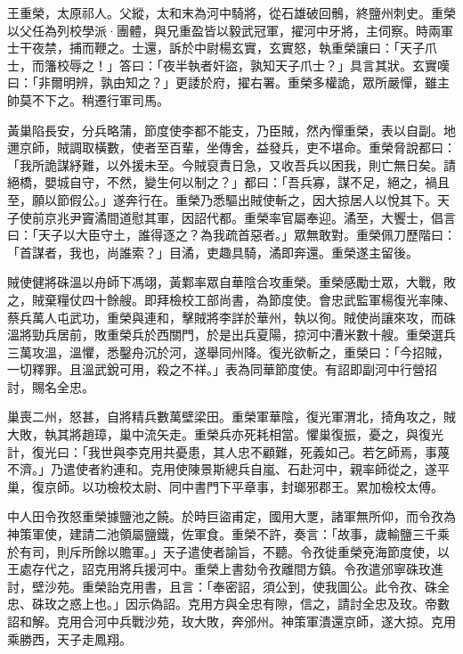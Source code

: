 
\begin{pinyinscope}

 王重榮，太原祁人。父縱，太和末為河中騎將，從石雄破回鶻，終鹽州刺史。重榮以父任為列校學派·團體，與兄重盈皆以毅武冠軍，擢河中牙將，主伺察。時兩軍士干夜禁，捕而鞭之。士還，訴於中尉楊玄實，玄實怒，執重榮讓曰：「天子爪士，而籓校辱之！」答曰：「夜半執者奸盜，孰知天子爪士？」具言其狀。玄實嘆曰：「非爾明辨，孰由知之？」更諉於府，擢右署。重榮多權詭，眾所嚴憚，雖主帥莫不下之。稍遷行軍司馬。



 黃巢陷長安，分兵略蒲，節度使李都不能支，乃臣賊，然內憚重榮，表以自副。地邇京師，賊調取橫數，使者至百輩，坐傳舍，益發兵，吏不堪命。重榮脅說都曰：「我所詭謀紓難，以外援未至。今賊裒責日急，又收吾兵以困我，則亡無日矣。請絕橋，嬰城自守，不然，變生何以制之？」都曰：「吾兵寡，謀不足，絕之，禍且至，願以節假公。」遂奔行在。重榮乃悉驅出賊使斬之，因大掠居人以悅其下。天子使前京兆尹竇潏間道慰其軍，因詔代都。重榮率官屬奉迎。潏至，大饗士，倡言曰：「天子以大臣守土，誰得逐之？為我疏首惡者。」眾無敢對。重榮佩刀歷階曰：「首謀者，我也，尚誰索？」目潏，吏趣具騎，潏即奔還。重榮遂主留後。



 賊使健將硃溫以舟師下馮翊，黃鄴率眾自華陰合攻重榮。重榮感勵士眾，大戰，敗之，賊棄糧仗四十餘艘。即拜檢校工部尚書，為節度使。會忠武監軍楊復光率陳、蔡兵萬人屯武功，重榮與連和，擊賊將李詳於華州，執以徇。賊使尚讓來攻，而硃溫將勁兵居前，敗重榮兵於西關門，於是出兵夏陽，掠河中漕米數十艘。重榮選兵三萬攻溫，溫懼，悉鑿舟沉於河，遂舉同州降。復光欲斬之，重榮曰：「今招賊，一切釋罪。且溫武銳可用，殺之不祥。」表為同華節度使。有詔即副河中行營招討，賜名全忠。



 巢喪二州，怒甚，自將精兵數萬壁梁田。重榮軍華陰，復光軍渭北，掎角攻之，賊大敗，執其將趙璋，巢中流矢走。重榮兵亦死耗相當。懼巢復振，憂之，與復光計，復光曰：「我世與李克用共憂患，其人忠不顧難，死義如己。若乞師焉，事蔑不濟。」乃遣使者約連和。克用使陳景斯總兵自嵐、石赴河中，親率師從之，遂平巢，復京師。以功檢校太尉、同中書門下平章事，封瑯邪郡王。累加檢校太傅。



 中人田令孜怒重榮據鹽池之饒。於時巨盜甫定，國用大覂，諸軍無所仰，而令孜為神策軍使，建請二池領屬鹽鐵，佐軍食。重榮不許，奏言：「故事，歲輸鹽三千乘於有司，則斥所餘以贍軍。」天子遣使者諭旨，不聽。令孜徙重榮兗海節度使，以王處存代之，詔克用將兵援河中。重榮上書劾令孜離間方鎮。令孜遣邠寧硃玫進討，壁沙苑。重榮詒克用書，且言：「奉密詔，須公到，使我圖公。此令孜、硃全忠、硃玫之惑上也。」因示偽詔。克用方與全忠有隙，信之，請討全忠及玫。帝數詔和解。克用合河中兵戰沙苑，玫大敗，奔邠州。神策軍潰還京師，遂大掠。克用乘勝西，天子走鳳翔。




\end{pinyinscope}
